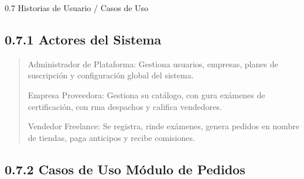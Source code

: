 \documentclass[
]{article}
\begin{document}
0.7 Historias de Usuario / Casos de Uso

\subsection{0.7.1 Actores del Sistema}\label{actores-del-sistema}

\begin{quote}
Administrador de Plataforma: Gestiona usuarios, empresas, planes de
suscripción y configuración global del sistema.

Empresa Proveedora: Gestiona su catálogo, con gura exámenes de
certificación, con rma despachos y califica vendedores.

Vendedor Freelance: Se registra, rinde exámenes, genera pedidos en
nombre de tiendas, paga anticipos y recibe comisiones.
\end{quote}

\subsection{0.7.2 Casos de Uso Módulo de
Pedidos}\label{casos-de-uso-muxf3dulo-de-pedidos}
\end{document}
